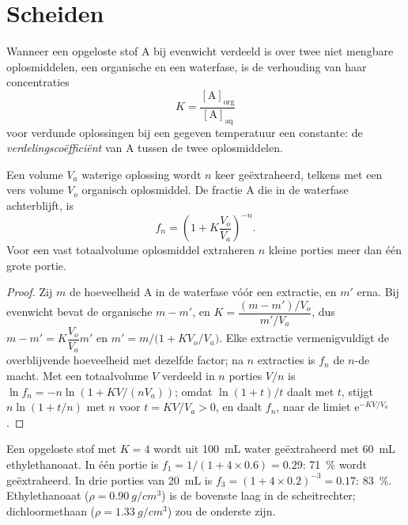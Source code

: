 \par\vspace{0pt plus 8\baselineskip}\vspace{0pt plus -8\baselineskip}
\section{Scheiden}

\begin{definition}[Verdelingscoëfficiënt]\label{def:b1:lab-techniques-1:partition-coefficient}
Wanneer een opgeloste stof A bij evenwicht verdeeld is over twee niet
mengbare oplosmiddelen, een organische  en een waterfase, is de
verhouding van haar concentraties
\[
  K = \frac{[\mathrm{A}]_{\mathrm{org}}}{[\mathrm{A}]_{\mathrm{aq}}}
\]
voor verdunde oplossingen bij een gegeven temperatuur een constante: de
\emph{verdelingscoëfficiënt} van A tussen de
twee oplosmiddelen.
\end{definition}

\begin{proposition}\label{prop:b1:lab-techniques-1:multiple-extractions}
Een volume $V_a$ waterige oplossing wordt $n$ keer geëxtraheerd, telkens
met een vers volume $V_o$ organisch oplosmiddel. De fractie A die in de
waterfase achterblijft, is
\[
  f_n = \left(1 + K \frac{V_o}{V_a}\right)^{-n}.
\]
Voor een vast totaalvolume oplosmiddel extraheren $n$ kleine porties meer
dan één grote portie.
\end{proposition}
\begin{proof}
Zij $m$ de hoeveelheid A in de waterfase vóór een extractie, en $m'$
erna. Bij evenwicht bevat de organische  $m - m'$, en
$K = \dfrac{(m - m')/V_o}{m'/V_a}$, dus $m - m' = K\dfrac{V_o}{V_a} m'$ en
$m' = m\big/\bigl(1 + K V_o/V_a\bigr)$. Elke extractie vermenigvuldigt de
overblijvende hoeveelheid met dezelfde factor; na $n$ extracties is $f_n$
de $n$-de macht. Met een totaalvolume $V$ verdeeld in $n$ porties $V/n$ is
$\ln f_n = -n \ln(1 + KV/(nV_a))$; omdat $\ln(1+t)/t$ daalt met $t$,
stijgt $n \ln(1 + t/n)$ met $n$ voor $t = KV/V_a > 0$, en daalt $f_n$, naar
de limiet $\mathrm{e}^{-KV/V_a}$.
\end{proof}

\begin{example}
Een opgeloste stof met $K = 4$ wordt uit \qty{100}{mL} water geëxtraheerd
met \qty{60}{mL} ethylethanoaat. In één portie is
$f_1 = 1/(1 + 4 \times 0.6) = 0.29$: \qty{71}{\percent} wordt
geëxtraheerd. In drie porties van \qty{20}{mL} is
$f_3 = (1 + 4 \times 0.2)^{-3} = 0.17$: \qty{83}{\percent}.
Ethylethanoaat ($\rho = \qty{0.90}{g/cm^3}$) is de bovenste laag in de
scheitrechter; dichloormethaan ($\rho = \qty{1.33}{g/cm^3}$) zou de
onderste zijn.
\end{example}

